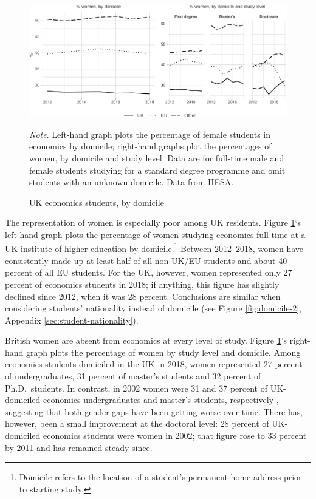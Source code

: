\documentclass[a4paper, 1]{article}
\begin{document}
\begin{figure}
\centering
\includegraphics[width=\linewidth]{0-images/domicile-1.pdf}

\caption{UK economics students, by domicile}
\label{fig:domicile}
\justify\footnotesize\textit{Note}.  Left-hand graph plots the percentage of female students in economics by domicile; right-hand graphs plot the percentages of women, by domicile and study level. Data are for full-time male and female students studying for a standard degree programme and omit students with an unknown domicile. Data from HESA.
\end{figure}



The representation of women is especially poor among UK residents. Figure \ref{fig:domicile}`s left-hand graph plots the percentage of women studying economics full-time at a UK institute of higher education by domicile.\footnote{Domicile refers to the location of a student's permanent home address prior to starting study.} Between 2012--2018, women have consistently made up at least half of all non-UK/EU students and about 40 percent of all EU students. For the UK, however, women represented only 27 percent of economics students in 2018; if anything, this figure has slightly declined since 2012, when it was 28 percent. Conclusions are similar when considering students' nationality instead of domicile (see Figure \ref{fig:domicile-2}, Appendix \ref{sec:student-nationality}).

British women are absent from economics at every level of study. Figure \ref{fig:domicile}'s right-hand graph plots the percentage of women by study level and domicile. Among economics students domiciled in the UK in 2018, women represented 27 percent of undergraduates, 31 percent of master's students and 32 percent of Ph.D.~students. In contrast, in 2002 women were 31 and 37 percent of UK-domiciled economics undergraduates and master's students, respectively \citep{Blanco2013, Mitka2015}, suggesting that both gender gaps have been getting worse over time. There has, however, been a small improvement at the doctoral level: 28 percent of UK-domiciled economics students were women in 2002; that figure rose to 33 percent by 2011 \citep{Blanco2013} and has remained steady since.
\end{document}
